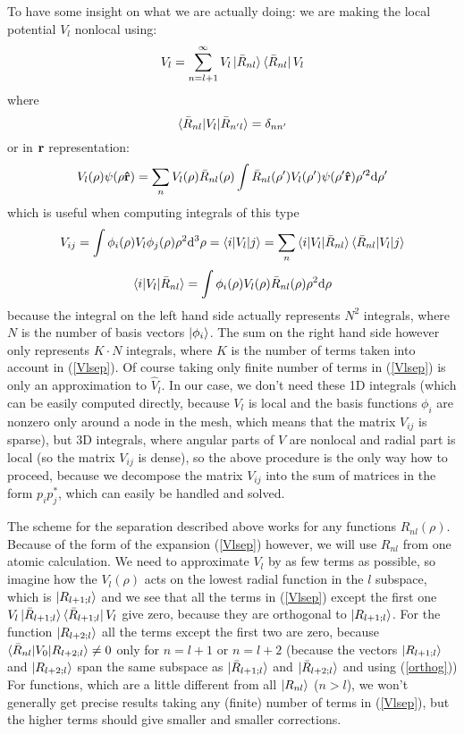 To have some insight on what we are actually doing: we are making the local potential $V_l$ nonlocal using: 
\begin{equation}
  V_l=\sum_{n=l+1}^\infty V_l\mathinner{|{\bar R_{nl}}\rangle}\mathinner{\langle{\bar R_{nl}}|}V_l  \label{Vlsep}
\end{equation}
where 
\begin{equation*}
  \mathinner{\langle{\bar R_{nl}|V_l|\bar R_{n'l}}\rangle}=\delta_{nn'}
\end{equation*}
or in ${\bf r}$ representation: 
\begin{equation*}
  V_l(\rho)\psi(\rho {\bf\hat r})=\sum_n V_l(\rho)\bar R_{nl}(\rho) \int\bar R_{nl}(\rho')V_l(\rho')\psi(\rho'{\bf\hat r})\rho'^2{\rm d} \rho'
\end{equation*}
which is useful when computing integrals of this type 
\begin{equation*}
  V_{ij} =\int\phi_i(\rho) V_l \phi_j(\rho) \rho^2{\rm d}^3 \rho =\mathinner{\langle{i|V_l|j}\rangle}= \sum_n \mathinner{\langle{i|V_l|{\bar R_{nl}}}\rangle}\mathinner{\langle{\bar R_{nl}|V_l|j}\rangle}
\end{equation*}
\begin{equation*}
  \mathinner{\langle{i|V_l|{\bar R_{nl}}}\rangle}=\int\phi_i(\rho)V_l(\rho)\bar R_{nl}(\rho) \rho^2{\rm d}\rho
\end{equation*}
because the integral on the left hand side actually represents $N^2$ integrals, where $N$ is the number of basis vectors $\mathinner{|{\phi_i}\rangle}$. The sum on the right hand side however only represents $K\cdot N$ integrals, where $K$ is the number of terms taken into account in (\ref{Vlsep}). Of course taking only finite number of terms in (\ref{Vlsep}) is only an approximation to $\hat V_l$. In our case, we don't need these 1D integrals (which can be easily computed directly, because $V_l$ is local and the basis functions $\phi_i$ are nonzero only around a node in the mesh, which means that the matrix $V_{ij}$ is sparse), but 3D integrals, where angular parts of $V$ are nonlocal and radial part is local (so the matrix $V_{ij}$ is dense), so the above procedure is the only way how to proceed, because we decompose the matrix $V_{ij}$ into the sum of matrices in the form $p_ip_j^*$, which can easily be handled and solved.

The scheme for the separation described above works for any functions $R_{nl}(\rho)$. Because of the form of the expansion (\ref{Vlsep}) however, we will use $R_{nl}$ from one atomic calculation. We need to approximate $V_l$ by as few terms as possible, so imagine how the $V_l(\rho)$ acts on the lowest radial function in the $l$ subspace, which is $\mathinner{|{R_{l+1;l}}\rangle}$ and we see that all the terms in (\ref{Vlsep}) except the first one $V_l\mathinner{|{\bar R_{l+1;l}}\rangle}\mathinner{\langle{\bar R_{l+1;l}}|}V_l$ give zero, because they are orthogonal to $\mathinner{|{R_{l+1;l}}\rangle}$. For the function $\mathinner{|{R_{l+2;l}}\rangle}$ all the terms except the first two are zero, because $\mathinner{\langle{\bar R_{nl}|V_0|R_{l+2;l}}\rangle}\neq0$ only for $n=l+1$ or $n=l+2$ (because the vectors $\mathinner{|{R_{l+1;l}}\rangle}$ and $\mathinner{|{R_{l+2;l}}\rangle}$ span the same subspace as $\mathinner{|{\bar R_{l+1;l}}\rangle}$ and $\mathinner{|{\bar R_{l+2;l}}\rangle}$ and using (\ref{orthog})) For functions, which are a little different from all $\mathinner{|{R_{nl}}\rangle}$ ($n>l$), we won't generally get precise results taking any (finite) number of terms in (\ref{Vlsep}), but the higher terms should give smaller and smaller corrections.

